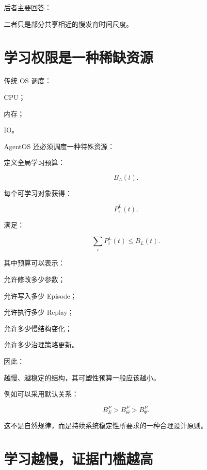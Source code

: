 后者主要回答：

\begin{statementbox}
\centering
{}
\end{statementbox}

二者只是部分共享相近的慢发育时间尺度。


\section{学习权限是一种稀缺资源}

传统 OS 调度：

CPU；

内存；

IO。

AgentOS 还必须调度一种特殊资源：

\begin{statementbox}
\centering
{}
\end{statementbox}

定义全局学习预算：

\[
B_L(t).
\]

每个可学习对象获得：

\[
P_i^L(t).
\]

满足：

\[
\boxed{
\sum_iP_i^L(t)
\le
B_L(t).
}
\]

其中预算可以表示：

允许修改多少参数；

允许写入多少 Episode；

允许执行多少 Replay；

允许多少慢结构变化；

允许多少治理策略更新。

因此：

\begin{statementbox}
\centering
{}
\end{statementbox}

越慢、越稳定的结构，其可塑性预算一般应该越小。

例如可以采用默认关系：

\[
\boxed{
B_E^P
>
B_{\Theta}^P
>
B_{\Psi}^P.
}
\]

这不是自然规律，而是持续系统稳定性所要求的一种合理设计原则。


\section{学习越慢，证据门槛越高}

